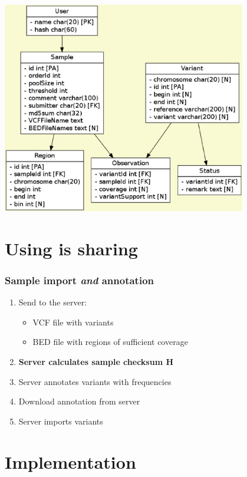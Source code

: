 \documentclass[slidestop]{beamer}
\begin{document}
\begin{frame}
  \begin{center}
    \includegraphics[width=0.8\textwidth]{schema}
  \end{center}
\end{frame}

\section{Using is sharing}

\begin{frame}
  \frametitle{Sample import {\em and} annotation}
  \begin{enumerate}
    \item<1-> Send to the server:
      \begin{itemize}
        \item VCF file with variants
        \item BED file with regions of sufficient coverage
      \end{itemize}
    \item<5-> {\bf Server calculates sample checksum H}
    \item<2-> Server annotates variants with frequencies 
    \item<3-> Download annotation from server
    \item<4-> Server imports variants 
  \end{enumerate}
\end{frame}

\section{Implementation}
\end{document}
